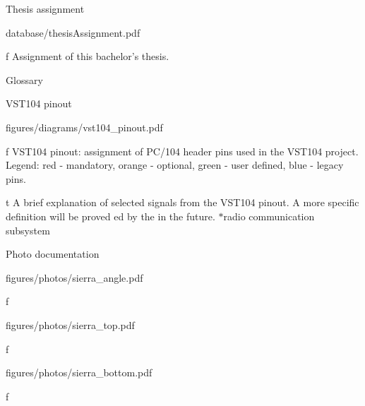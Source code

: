 

\app Thesis assignment

\midinsert
    \hsize \cinspic database/thesisAssignment.pdf
    \caption/f Assignment of this bachelor's thesis.
\endinsert




\app Glossary
\makeglos




\app VST104 pinout

\midinsert
    \hsize \cinspic figures/diagrams/vst104_pinout.pdf
    \caption/f VST104 pinout: assignment of PC/104 header pins used in the VST104 project. Legend: red - mandatory, orange - optional, green - user defined, blue - legacy pins.
\endinsert

\midinsert {}
    \caption/t A brief explanation of selected signals from the VST104 pinout. A more specific definition will be proved ed by the  in the future. $*$radio communication subsystem
\endinsert




\app Photo documentation

\midinsert
    \hsize \cinspic figures/photos/sierra_angle.pdf
    \caption/f 
\endinsert

\midinsert
    \picw=90.17mm \cinspic figures/photos/sierra_top.pdf
    \caption/f 
\endinsert

\midinsert
    \picw=90.17mm\cinspic figures/photos/sierra_bottom.pdf
    \caption/f 
\endinsert

